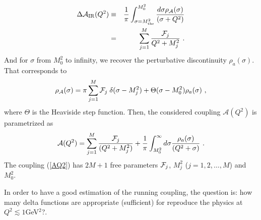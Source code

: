 \documentclass[3p,times,twocolumn]{elsarticle}
\def\be{\begin{equation}}
\def\ee{\end{equation}}
\def\bea{\begin{eqnarray}}
\def\eea{\end{eqnarray}}
\newcommand{\A}{{\mathcal{A}}}
\begin{document}
\bea
\Delta \A_{\rm IR}(Q^2) &\equiv&  \frac{1}{\pi} \int_{\sigma=M_{\rm thr}^2}^{M_0^2} \frac{d \sigma \rho_{\A}(\sigma)}{(\sigma + Q^2)} 
\label{M1M}
\nonumber\\
&=&  \sum_{j=1}^{M} \frac{{\cal F}_j}{Q^2 + M_j^2} \ .
\label{PFM1M}
\eea
And for $\sigma$ from $M_0^2$ to infinity, we recover the perturbative discontinuity $\rho_a(\sigma)$. That corresponds to 
\be
\rho_{\A}(\sigma) =  \pi \sum_{j=1}^{M} {\cal F}_j \; \delta(\sigma - M_j^2)  + \Theta(\sigma - M_0^2) \rho_a(\sigma) \ ,
\label{rhoA}
\ee
where $\Theta$ is the Heaviside step function. Then, the considered coupling $\A(Q^2)$ is parametrized as 
\be
\A(Q^2)=\sum_{j=1}^M \frac{{\cal F}_j}{(Q^2 + M_j^2)} + \frac{1}{\pi} \int_{M_0^2}^{\infty} d \sigma \frac{ \rho_a(\sigma) }{(Q^2 + \sigma)} \ .
\label{AQ2}
\ee
The coupling (\ref{AQ2}) has $2M+1$ free parameters ${\cal F}_j$, $M^2_j$ ($j=1,2,\ldots ,M$) and $M_0^2$.

In order to have a good estimation of the running coupling, the question is: how many delta functions are appropriate (sufficient) for reproduce the physics at $Q^2\lesssim 1$GeV$^2$?.
\end{document}
